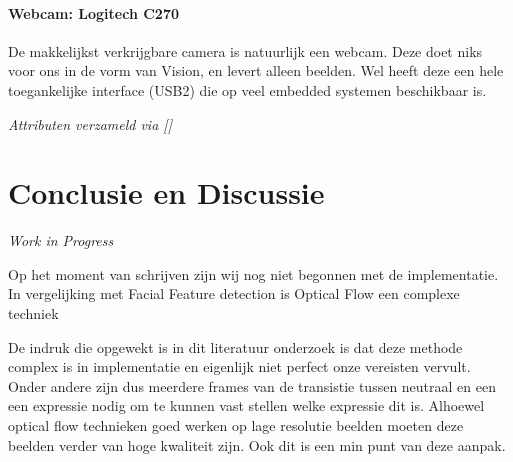 \documentclass[11pt]{article}
\begin{document}
    \paragraph{Webcam: Logitech C270}
    De makkelijkst verkrijgbare camera is natuurlijk een webcam. Deze doet niks voor ons in de vorm van Vision, en levert alleen beelden. 
    Wel heeft deze een hele toegankelijke interface (USB2) die op veel embedded systemen beschikbaar is.
    
    \emph{Attributen verzameld via []}


    \scriptsize{
    }



    \section{Conclusie en Discussie}\label{sec:conclusie-en-discussie}
    \emph{Work in Progress}

    Op het moment van schrijven zijn wij nog niet begonnen met de implementatie.
    In vergelijking met Facial Feature detection is Optical Flow een complexe techniek


    De indruk die opgewekt is in dit literatuur onderzoek is dat deze methode complex is in implementatie en eigenlijk niet perfect onze vereisten vervult.
    Onder andere zijn dus meerdere frames van de transistie tussen neutraal en een een expressie nodig om te kunnen vast stellen welke expressie dit is.
    Alhoewel optical flow technieken goed werken op lage resolutie beelden moeten deze beelden verder van hoge kwaliteit zijn.
    Ook dit is een min punt van deze aanpak.
\end{document}
